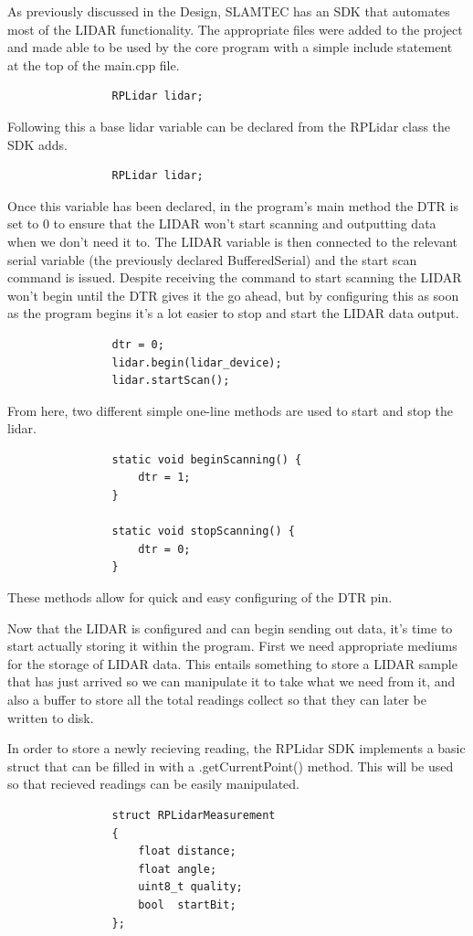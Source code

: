 				As previously discussed in the Design, SLAMTEC has an SDK that automates most of the LIDAR functionality. The appropriate files were added to the project and made able to be used by the core program with a simple include statement at the top of the main.cpp file.
				\begin{lstlisting}
				RPLidar lidar;
				\end{lstlisting}
				
				Following this a base lidar variable can be declared from the RPLidar class the SDK adds.
				\begin{lstlisting}
				RPLidar lidar;
				\end{lstlisting}
				
				Once this variable has been declared, in the program's main method the DTR is set to 0 to ensure that the LIDAR won't start scanning and outputting data when we don't need it to. The LIDAR variable is then connected to the relevant serial variable (the previously declared BufferedSerial) and the start scan command is issued. Despite receiving the command to start scanning the LIDAR won't begin until the DTR gives it the go ahead, but by configuring this as soon as the program begins it's a lot easier to stop and start the LIDAR data output.
				\begin{lstlisting}
				dtr = 0;
				lidar.begin(lidar_device);
				lidar.startScan();
				\end{lstlisting}
				
				From here, two different simple one-line methods are used to start and stop the lidar.
				\begin{lstlisting}
				static void beginScanning() {
					dtr = 1;
				}
				
				static void stopScanning() {
					dtr = 0;
				}
				\end{lstlisting}
				These methods allow for quick and easy configuring of the DTR pin.
				
				Now that the LIDAR is configured and can begin sending out data, it's time to start actually storing it within the program. First we need appropriate mediums for the storage of LIDAR data. This entails something to store a LIDAR sample that has just arrived so we can manipulate it to take what we need from it, and also a buffer to store all the total readings collect so that they can later be written to disk. 
				
				In order to store a newly recieving reading, the RPLidar SDK implements a basic struct that can be filled in with a .getCurrentPoint() method. This will be used so that recieved readings can be easily manipulated.
				\begin{lstlisting}
				struct RPLidarMeasurement
				{
					float distance;
					float angle;
					uint8_t quality;
					bool  startBit;
				};
				\end{lstlisting}
				
